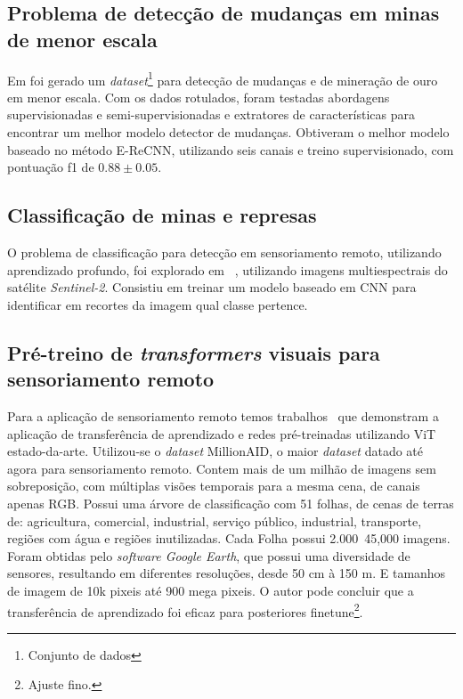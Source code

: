 \subsection{Problema de detecção de mudanças em minas de menor escala}\label{sec:Cap2_deteccao_mudanca}

Em \cite{rs14071746} foi gerado um \textit{dataset}\footnote{Conjunto de dados} para detecção de mudanças e de mineração de ouro em menor escala. Com os dados rotulados, foram testadas abordagens supervisionadas e semi-supervisionadas e extratores de características para encontrar um melhor modelo detector de mudanças. Obtiveram o melhor modelo baseado no método E-ReCNN, utilizando seis canais e treino supervisionado, com pontuação f1 de $0.88\pm0.05$.

\subsection{Classificação de minas e represas}\label{sec:Cap2_minas_represa_classificacao}

O problema de classificação para detecção em sensoriamento remoto, utilizando aprendizado profundo, foi explorado em ~\cite{s20236936}, utilizando imagens multiespectrais do satélite \textit{Sentinel-2}. Consistiu em treinar um modelo baseado em CNN para identificar em recortes da imagem qual classe pertence.

\subsection{Pré-treino de \textit{transformers} visuais para sensoriamento remoto}\label{sec:Cap2_million}

Para a aplicação de sensoriamento remoto temos trabalhos~\cite{wang2022empirical} que demonstram a aplicação de transferência de aprendizado e redes pré-treinadas utilizando ViT estado-da-arte. Utilizou-se o \textit{dataset} MillionAID, o maior \textit{dataset} datado até agora para sensoriamento remoto. Contem mais de um milhão de imagens sem sobreposição, com múltiplas visões temporais para a mesma cena, de canais apenas RGB. Possui uma árvore de classificação com 51 folhas, de cenas de terras de: agricultura, comercial, industrial, serviço público, industrial, transporte, regiões com água e regiões inutilizadas. Cada Folha possui 2.000~45,000 imagens. Foram obtidas pelo \textit{software Google Earth}, que possui uma diversidade de sensores, resultando em diferentes resoluções, desde 50 cm à 150 m. E tamanhos de imagem de 10k pixeis até 900 mega pixeis.
O autor pode concluir que a transferência de aprendizado foi eficaz para posteriores finetune\footnote{Ajuste fino.}.

